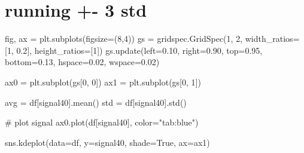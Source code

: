 \documentclass[
  letterpaper,
  DIV=11,
  numbers=noendperiod,
  oneside]{scrreprt}
\newenvironment{Shaded}{\begin{snugshade}}{\end{snugshade}}
\newcommand{\CommentTok}[1]{\textcolor[rgb]{0.37,0.37,0.37}{#1}}
\newcommand{\DecValTok}[1]{\textcolor[rgb]{0.68,0.00,0.00}{#1}}
\newcommand{\FloatTok}[1]{\textcolor[rgb]{0.68,0.00,0.00}{#1}}
\newcommand{\NormalTok}[1]{\textcolor[rgb]{0.00,0.23,0.31}{#1}}
\newcommand{\OperatorTok}[1]{\textcolor[rgb]{0.37,0.37,0.37}{#1}}
\newcommand{\StringTok}[1]{\textcolor[rgb]{0.13,0.47,0.30}{#1}}
\newcommand{\VariableTok}[1]{\textcolor[rgb]{0.07,0.07,0.07}{#1}}
\begin{document}
\hypertarget{running---3-std}{%
\section{running +- 3 std}\label{running---3-std}}

\begin{Shaded}
\begin{Highlighting}[]
\NormalTok{fig, ax }\OperatorTok{=}\NormalTok{ plt.subplots(figsize}\OperatorTok{=}\NormalTok{(}\DecValTok{8}\NormalTok{,}\DecValTok{4}\NormalTok{))}
\NormalTok{gs }\OperatorTok{=}\NormalTok{ gridspec.GridSpec(}\DecValTok{1}\NormalTok{, }\DecValTok{2}\NormalTok{, width\_ratios}\OperatorTok{=}\NormalTok{[}\DecValTok{1}\NormalTok{, }\FloatTok{0.2}\NormalTok{], height\_ratios}\OperatorTok{=}\NormalTok{[}\DecValTok{1}\NormalTok{])}
\NormalTok{gs.update(left}\OperatorTok{=}\FloatTok{0.10}\NormalTok{, right}\OperatorTok{=}\FloatTok{0.90}\NormalTok{, top}\OperatorTok{=}\FloatTok{0.95}\NormalTok{, bottom}\OperatorTok{=}\FloatTok{0.13}\NormalTok{,}
\NormalTok{          hspace}\OperatorTok{=}\FloatTok{0.02}\NormalTok{, wspace}\OperatorTok{=}\FloatTok{0.02}\NormalTok{)}

\NormalTok{ax0 }\OperatorTok{=}\NormalTok{ plt.subplot(gs[}\DecValTok{0}\NormalTok{, }\DecValTok{0}\NormalTok{])}
\NormalTok{ax1 }\OperatorTok{=}\NormalTok{ plt.subplot(gs[}\DecValTok{0}\NormalTok{, }\DecValTok{1}\NormalTok{])}

\NormalTok{avg }\OperatorTok{=}\NormalTok{ df[}\StringTok{\textquotesingle{}signal40\textquotesingle{}}\NormalTok{].mean()}
\NormalTok{std }\OperatorTok{=}\NormalTok{ df[}\StringTok{\textquotesingle{}signal40\textquotesingle{}}\NormalTok{].std()}

\CommentTok{\# plot signal}
\NormalTok{ax0.plot(df[}\StringTok{\textquotesingle{}signal40\textquotesingle{}}\NormalTok{], color}\OperatorTok{=}\StringTok{"tab:blue"}\NormalTok{)}

\NormalTok{sns.kdeplot(data}\OperatorTok{=}\NormalTok{df, y}\OperatorTok{=}\StringTok{\textquotesingle{}signal40\textquotesingle{}}\NormalTok{, shade}\OperatorTok{=}\VariableTok{True}\NormalTok{, ax}\OperatorTok{=}\NormalTok{ax1)}



\end{Highlighting}
\end{Shaded}
\end{document}
